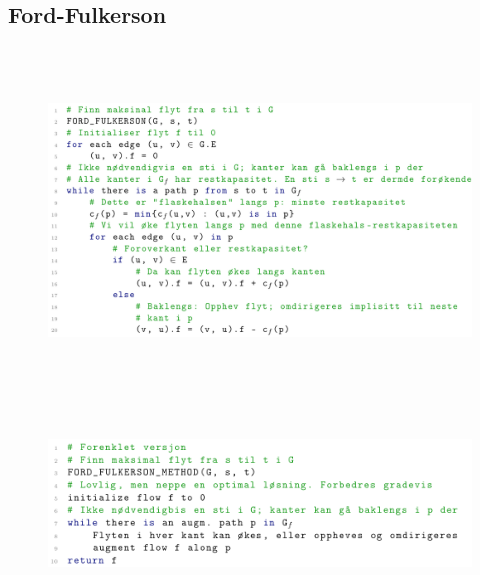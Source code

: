 \documentclass[12pt]{report}
\begin{document}




\newpage
\par

\subsection*{Ford-Fulkerson}



\begin{figure}[H]
	\begin{Center}
		\includegraphics[width=6.53in,height=3.6in]{./media/image203.png}
	\end{Center}
\end{figure}



\par


\vspace{\baselineskip}



\begin{figure}[H]
	\begin{Center}
		\includegraphics[width=6.3in,height=1.91in]{./media/image204.png}
	\end{Center}
\end{figure}
\end{document}
